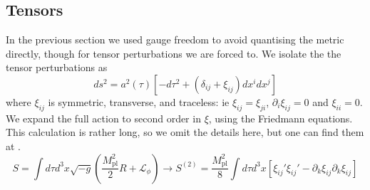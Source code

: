 \documentclass[a4paper,10pt]{article}
\newcommand{\Mp}{M_{\text{pl}}}
\begin{document}
\subsection{Tensors}

In the previous section we used gauge freedom to avoid quantising the metric directly, though for tensor perturbations we are forced to. We isolate the the tensor perturbations as 
\begin{equation}
ds^2 = a^2(\tau)[-d\tau^2 + (\delta_{ij}+\xi_{ij})dx^idx^j]
\end{equation}
where $\xi_{ij}$ is symmetric, transverse, and traceless: ie $\xi_{ij}=\xi_{ji}$, $\partial_i\xi_{ij}=0$ and $\xi_{ii}=0$.\\

We expand the full action to second order in $\xi$, using the Friedmann equations. This calculation is rather long, so we omit the details here, but one can find them at \cite{wang}. 
\begin{equation}
S= \int d\tau d^3x \sqrt{-g}\left(\frac{\Mp^2}{2}R +\mathcal{L}_\phi \right)\rightarrow S^{(2)} = \frac{\Mp^2}{8}\int d\tau d^3x [\xi_{ij}'\xi_{ij}'-\partial_k\xi_{ij}\partial_k\xi_{ij}]
\end{equation}
\end{document}
